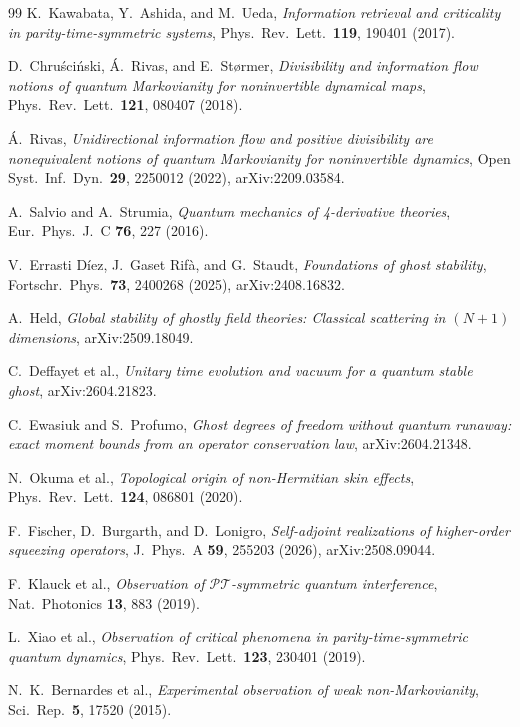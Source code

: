 \documentclass[11pt]{article}
\theoremstyle{definition}
\theoremstyle{remark}
\newcommand{\PT}{\mathcal{PT}}
\begin{document}
\begin{thebibliography}{99}
K.~Kawabata, Y.~Ashida, and M.~Ueda,
\emph{Information retrieval and criticality in parity-time-symmetric
systems},
Phys.\ Rev.\ Lett.\ \textbf{119}, 190401 (2017).

D.~Chru\'sci\'nski, \'A.~Rivas, and E.~St{\o}rmer,
\emph{Divisibility and information flow notions of quantum Markovianity
for noninvertible dynamical maps},
Phys.\ Rev.\ Lett.\ \textbf{121}, 080407 (2018).

\'A.~Rivas,
\emph{Unidirectional information flow and positive divisibility are
nonequivalent notions of quantum Markovianity for noninvertible
dynamics},
Open Syst.\ Inf.\ Dyn.\ \textbf{29}, 2250012 (2022),
arXiv:2209.03584.

A.~Salvio and A.~Strumia,
\emph{Quantum mechanics of 4-derivative theories},
Eur.\ Phys.\ J.\ C \textbf{76}, 227 (2016).

V.~Errasti D\'iez, J.~Gaset Rif\`a, and G.~Staudt,
\emph{Foundations of ghost stability},
Fortschr.\ Phys.\ \textbf{73}, 2400268 (2025), arXiv:2408.16832.

A.~Held,
\emph{Global stability of ghostly field theories: Classical
scattering in $(N{+}1)$ dimensions},
arXiv:2509.18049.

C.~Deffayet et al.,
\emph{Unitary time evolution and vacuum for a quantum stable ghost},
arXiv:2604.21823.

C.~Ewasiuk and S.~Profumo,
\emph{Ghost degrees of freedom without quantum runaway: exact moment
bounds from an operator conservation law},
arXiv:2604.21348.

N.~Okuma et al.,
\emph{Topological origin of non-Hermitian skin effects},
Phys.\ Rev.\ Lett.\ \textbf{124}, 086801 (2020).

F.~Fischer, D.~Burgarth, and D.~Lonigro,
\emph{Self-adjoint realizations of higher-order squeezing operators},
J.\ Phys.\ A \textbf{59}, 255203 (2026), arXiv:2508.09044.

F.~Klauck et al.,
\emph{Observation of $\PT$-symmetric quantum interference},
Nat.\ Photonics \textbf{13}, 883 (2019).

L.~Xiao et al.,
\emph{Observation of critical phenomena in parity-time-symmetric
quantum dynamics},
Phys.\ Rev.\ Lett.\ \textbf{123}, 230401 (2019).

N.~K.~Bernardes et al.,
\emph{Experimental observation of weak non-Markovianity},
Sci.\ Rep.\ \textbf{5}, 17520 (2015).


\end{thebibliography}
\end{document}
